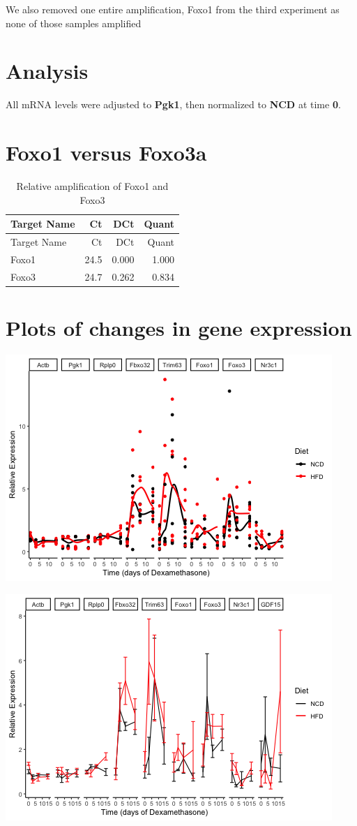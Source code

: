 \documentclass[]{article}
\begin{document}
We also removed one entire amplification, Foxo1 from the third
experiment as none of those samples amplified

\section{Analysis}\label{analysis}

All mRNA levels were adjusted to \textbf{Pgk1}, then normalized to
\textbf{NCD} at time \textbf{0}.

\section{Foxo1 versus Foxo3a}\label{foxo1-versus-foxo3a}

\begin{longtable}[]{@{}lrrr@{}}
\caption{Relative amplification of Foxo1 and Foxo3}\tabularnewline
\toprule
Target Name & Ct & DCt & Quant\tabularnewline
\midrule
\endfirsthead
\toprule
Target Name & Ct & DCt & Quant\tabularnewline
\midrule
\endhead
Foxo1 & 24.5 & 0.000 & 1.000\tabularnewline
Foxo3 & 24.7 & 0.262 & 0.834\tabularnewline
\bottomrule
\end{longtable}

\section{Plots of changes in gene
expression}\label{plots-of-changes-in-gene-expression}

\includegraphics{figures/lineplot-all-points-1.png}

\includegraphics{figures/lineplot-all-1.png}
\end{document}
